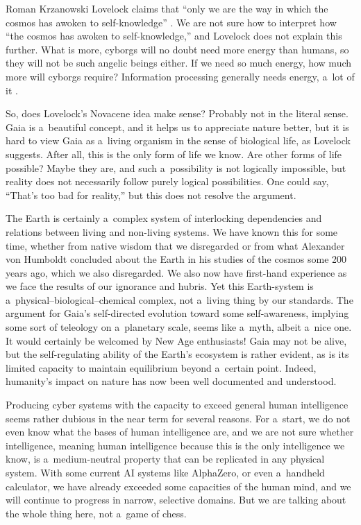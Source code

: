 \begin{newrevengenv}{Roman Krzanowski}
Lovelock claims that ``only we are the way in which the cosmos has awoken to self-knowledge''
\parencite*[][p.12]{lovelock_novacene_2019}. %
 We are not sure how to interpret how ``the cosmos has awoken to self-knowledge,'' and Lovelock does not explain this further. What is more, cyborgs will no doubt need more energy than humans, so they will not be such angelic beings either. If we need so much energy, how much more will cyborgs require? Information processing generally needs energy, a~lot of it 
\parencites[][]{landauer_irreversibility_1961}[or][]{bremermann_minimum_1982}[see also][]{shendruk_how_2021}.%


So, does Lovelock's Novacene idea make sense? Probably not in the literal sense. Gaia is a~beautiful concept, and it helps us to appreciate nature better, but it is hard to view Gaia as a~living organism in the sense of biological life, as Lovelock suggests. After all, this is the only form of life we know. Are other forms of life possible? Maybe they are, and such a~possibility is not logically impossible, but reality does not necessarily follow purely logical possibilities. One could say, ``That's too bad for reality,'' but this does not resolve the argument.

The Earth is certainly a~complex system of interlocking dependencies and relations between living and non-living systems. We have known this for some time, whether from native wisdom that we disregarded
\parencite[see for example][]{abram_spell_1996} %
 or from what Alexander von Humboldt concluded about the Earth in his studies of the cosmos some 200 years ago, which we also disregarded. We also now have first-hand experience as we face the results of our ignorance and hubris. Yet this Earth-system is a~physical–biological–chemical complex, not a~living thing by our standards. The argument for Gaia's self-directed evolution toward some self-awareness, implying some sort of teleology on a~planetary scale, seems like a~myth, albeit a~nice one. It would certainly be welcomed by New Age enthusiasts! Gaia may not be alive, but the self-regulating ability of the Earth's ecosystem is rather evident, as is its limited capacity to maintain equilibrium beyond a~certain point. Indeed, humanity's impact on nature has now been well documented and understood.

Producing cyber systems with the capacity to exceed general human intelligence seems rather dubious in the near term for several reasons. For a~start, we do not even know what the bases of human intelligence are, and we are not sure whether intelligence, meaning human intelligence because this is the only intelligence we know, is a~medium-neutral property that can be replicated in any physical system. With some current AI systems like AlphaZero, or even a~handheld calculator, we have already exceeded some capacities of the human mind, and we will continue to progress in narrow, selective domains. But we are talking about the whole thing here, not a~game of chess.


\end{newrevengenv}
